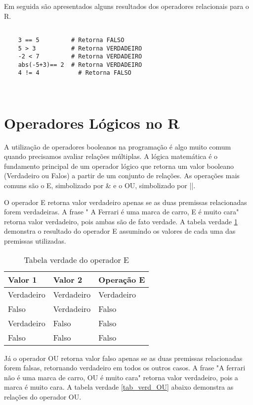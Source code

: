 Em seguida são apresentados alguns resultados dos operadores relacionais para o R. 

\begin{scriptsize}
	\estiloR
	\begin{lstlisting}[]
	
	3 == 5         # Retorna FALSO
	5 > 3          # Retorna VERDADEIRO 
	-2 < 7         # Retorna VERDADEIRO
	abs(-5+3)== 2  # Retorna VERDADEIRO  
	4 != 4 		     # Retorna FALSO
	
	
	\end{lstlisting}
\end{scriptsize}

\section{Operadores Lógicos no R} 

A utilização de operadores booleanos na programação é algo muito comum quando precisamos avaliar relações múltiplas. A lógica matemática é o fundamento principal de um operador lógico que retorna um valor booleano (Verdadeiro ou Falos) a partir de um conjunto de relações. As operações mais comuns são o E, simbolizado por \& e o OU, simbolizado por ||. 

O operador E retorna valor verdadeiro apenas se as duas premissas relacionadas forem verdadeiras. A frase " A Ferrari é uma marca de carro, E é muito cara" retorna valor verdadeiro, pois ambas são de fato verdade. A tabela verdade \ref{tab_verd_E} demonstra o resultado do operador E assumindo os valores de cada uma das premissas utilizadas. 

\FloatBarrier
\begin{table}[h]
	\centering
	\begin{tabular}{@{}lll@{}}
		\toprule
		Valor 1    & Valor 2    & Operação E \\ \midrule
		Verdadeiro & Verdadeiro & Verdadeiro \\
		Falso      & Verdadeiro & Falso      \\
		Verdadeiro & Falso      & Falso      \\
		Falso      & Falso      & Falso      \\ \bottomrule
	\end{tabular}
	\caption{Tabela verdade do operador E}
	\label{tab_verd_E}
\end{table}
\FloatBarrier

Já o operador OU retorna valor falso apenas se as duas premissas relacionadas forem falsas, retornando verdadeiro em todos os outros casos. A frase "A ferrari não é uma marca de carro, OU é muito cara" retorna valor verdadeiro, pois a marca é muito cara. A tabela verdade \ref{tab_verd_OU} abaixo demonstra as relações do operador OU.

